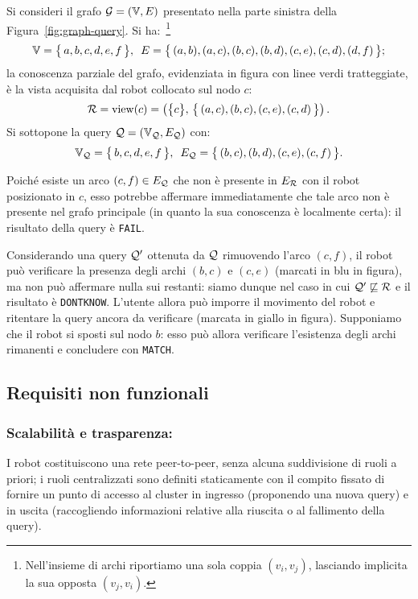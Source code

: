 \begin{example}
Si consideri il grafo $\mathcal{G} = (\mathbb{V}, E)$ presentato nella parte sinistra
della Figura~\ref{fig:graph-query}. Si ha:~\footnote{Nell'insieme di archi
riportiamo una sola coppia $(v_i, v_j)$, lasciando implicita la sua
opposta $(v_j, v_i)$.}
\[
\mathbb{V} = \bigl\{\,a, b, c, d, e, f\,\bigr\}, \ \,
E = \bigl\{\,(a,b),(a,c),(b,c),(b,d),(c,e),(c,d),(d,f)\,\bigr\};
\]
la conoscenza parziale del grafo,
evidenziata in figura con linee verdi tratteggiate,
è la vista acquisita dal robot collocato
sul nodo $c$: \[
\mathcal{R} = \mathrm{view}(c) = \left(\bigl\{c\bigr\},\,
\bigl\{\,(a,c), (b,c), (c,e), (c,d)\,\bigr\}\right). \]
Si sottopone la query $\mathcal{Q} = (\mathbb{V}_{\mathcal{Q}}, E_{\mathcal{Q}})$ con:\[
\mathbb{V}_{\mathcal{Q}} = \bigl\{\,b, c, d, e, f\,\bigr\}, \ \,
E_{\mathcal{Q}} = \bigl\{\,(b,c),(b,d),(c,e),(c,f)\,\bigr\}. \]

Poiché esiste un arco $(c,f) \in E_{\mathcal{Q}}$ che non è presente in $E_{\mathcal{R}}$
con il robot posizionato in $c$, esso potrebbe affermare immediatamente
che tale arco non è presente nel grafo principale
(in quanto la sua conoscenza è localmente certa): il risultato della query
è \texttt{FAIL}.

Considerando una query $\mathcal{Q}'$ ottenuta da $\mathcal{Q}$ rimuovendo l'arco
$(c, f)$, il robot può verificare la presenza degli archi $(b,c)$ e $(c,e)$
(marcati in blu in figura), ma non può affermare nulla sui restanti:
siamo dunque nel caso in cui $\mathcal{Q}' \not\sqsubseteq \mathcal{R}$ e il risultato
è \texttt{DONTKNOW}.
L'utente allora può imporre il movimento del robot e ritentare
la query ancora da verificare (marcata in giallo in figura).
Supponiamo che il robot si sposti sul nodo $b$: esso può allora verificare
l'esistenza degli archi rimanenti e concludere con \texttt{MATCH}.
\end{example}

\subsection{Requisiti non funzionali}
\label{sec:nonfunc-req}

\subsubsection*{Scalabilità e trasparenza:}
I robot costituiscono una rete peer-to-peer,
senza alcuna suddivisione di ruoli a priori; i ruoli centralizzati
sono definiti staticamente con il compito fissato di fornire un punto
di accesso al cluster in ingresso (proponendo una nuova query) e
in uscita (raccogliendo informazioni relative alla riuscita
o al fallimento della query).

